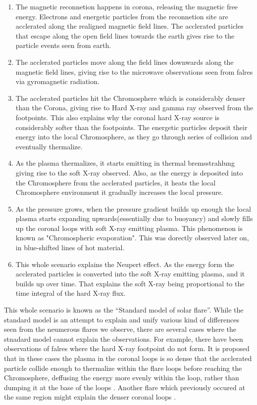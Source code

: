 \begin{enumerate}
    \item The magnetic reconnetion happens in corona, releasing the magnetic free energy. Electrons and energetic particles from the reconnetion site are acclerated along the realigned magnetic field lines. The acclerated particles that escape along the open field lines towards the earth gives rise to the particle events seen from earth.
    \item The acclerated particles move along the field lines downwards along the magnetic field lines, giving rise to the microwave observations seen from falres via gyromagnetic radiation.
    \item The acclerated particles hit the Chromosphere which is considerably denser than the Corona, giving rise to Hard X-ray and gamma ray observed from the footpoints. This also explains why the coronal hard X-ray source is considerably softer than the footpoints. The energetic particles deposit their energy into the local Chromosphere, as they go through series of collision and eventually thermalize.
    \item  As the plasma thermalizes, it starts emitting in thermal bremsstrahlung giving rise to the soft X-ray observed. Also, as the energy is deposited into the Chromosphere from the acclerated particles, it heats the local Chromosphere environment it gradually increases the local pressure. 
    \item As the pressure grows, when the pressure gradient builds up enough the local plasma starts expanding upwards(essentially due to buoyancy) and slowly fills up the coronal loops with soft X-ray emitting plasma. This phenomenon is known as "Chromospheric evaporation". This was dorectly observed later on, in blue-shifted lines of hot material.
    \item This whole scenario explains the Neupert effect. As the energy form the acclerated particles is converted into the soft X-ray emitting plasma, and it builds up over time. That explains the soft X-ray being proportional to the time integral of the hard X-ray flux.
\end{enumerate}

This whole scenario is known as the ``Standard model of solar flare''. While the standard model is an attempt to explain and unify various kind of differences seen from the neumerous flares we observe, there are several cases where the stnadard model cannot explain the observations. For example, there have been observations of falres where the hard X-ray footpoint do not form. It is proposed that in these cases the plasma in the coronal loops is so dense that the acclerated particle collide enough to thermalize within the flare loops before reaching the Chromosphere, deffusing the energy more evenly within the loop, rather than dumping it at the base of the loops \citep{veronig02,veronig04}. Another flare which previously occured at the same region might explain the denser coronal loops \citep{strong84,bone07}.  

